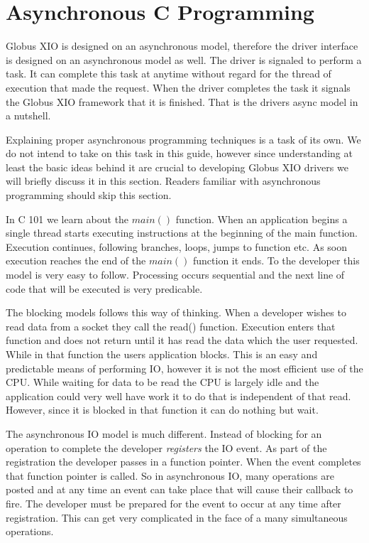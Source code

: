 \documentclass[11pt]{article}
\begin{document}
\section{Asynchronous C Programming}
Globus XIO is designed on an asynchronous model, therefore
the driver interface is designed on an asynchronous model as well.
The driver is signaled to perform a task.  It can complete this
task at anytime without regard for the thread of execution that
made the request.  When the driver completes the task it signals
the Globus XIO framework that it is finished.  That is the drivers 
async model in a nutshell.  

Explaining
proper asynchronous programming techniques is a task of its own.  We
do not intend to take on this task in this guide, however since 
understanding at least the basic ideas behind it are crucial to 
developing Globus XIO drivers we will briefly discuss it in this section.
Readers familiar with asynchronous programming should skip this section.

In C 101 we learn about the $main()$ function.  When an application 
begins a single thread starts executing instructions at the beginning
of the main function.  Execution continues, following branches, loops,
jumps to function etc.  As soon execution reaches the end of the $main()$
function it ends.  To the developer this model is very easy to follow.
Processing occurs sequential and the next line of code that will be executed
is very predicable.

The blocking models follows this way of thinking.  When a developer wishes
to read data from a socket they call the read() function.  Execution 
enters that function and does not return until it has read the data which
the user requested.  While in that function the users application 
blocks.  This is an easy and predictable means of performing IO, however
it is not the most efficient use of the CPU.  While waiting for data
to be read the CPU is largely idle and the application could very well
have work it to do that is independent of that read.  However, since
it is blocked in that function it can do nothing but wait.

The asynchronous IO model is much different.  Instead of blocking
for an operation to complete the developer \emph{registers} the IO event.
As part of the registration the developer passes in a function pointer.
When the event completes that function pointer is called.  So in 
asynchronous IO, many operations are posted and at any time an event
can take place that will cause their callback to fire.  The developer
must be prepared for the event to occur at any time after registration.
This can get very complicated in the face of a many simultaneous
operations.
\end{document}
